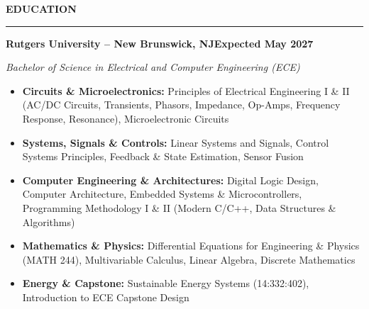 \documentclass[10pt]{article}
\newcommand{\Section}[1]{%
  \vspace{4.5pt}%
  \textbf{\MakeUppercase{#1}}\par\vspace{-3.5pt}%
  \rule{\linewidth}{0.55pt}\par\vspace{2.5pt}%
}
\newcommand{\Company}[2]{\noindent\textbf{#1}\hfill\textbf{#2}\par}
\newcommand{\RoleDates}[2]{\noindent\textit{#1}\hfill\textit{#2}\par}
\begin{document}
\Section{Education}
\Company{Rutgers University -- New Brunswick, NJ}{Expected May 2027}
\RoleDates{Bachelor of Science in Electrical and Computer Engineering (ECE)}{}
\vspace{1.5pt}
\begin{itemize}[leftmargin=0.15in, label={}, itemsep=1.0pt, topsep=1.0pt]
  \item \textbf{Circuits \& Microelectronics:} Principles of Electrical Engineering I \& II (AC/DC Circuits, Transients, Phasors, Impedance, Op-Amps, Frequency Response, Resonance), Microelectronic Circuits
  \item \textbf{Systems, Signals \& Controls:} Linear Systems and Signals, Control Systems Principles, Feedback \& State Estimation, Sensor Fusion
  \item \textbf{Computer Engineering \& Architectures:} Digital Logic Design, Computer Architecture, Embedded Systems \& Microcontrollers, Programming Methodology I \& II (Modern C/C++, Data Structures \& Algorithms)
  \item \textbf{Mathematics \& Physics:} Differential Equations for Engineering \& Physics (MATH 244), Multivariable Calculus, Linear Algebra, Discrete Mathematics
  \item \textbf{Energy \& Capstone:} Sustainable Energy Systems (14:332:402), Introduction to ECE Capstone Design
\end{itemize}
\end{document}
